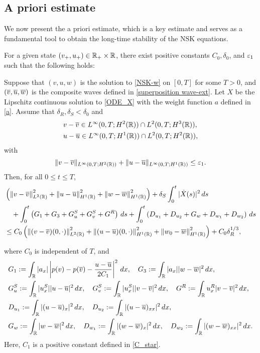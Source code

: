 \documentclass[11pt,reqno]{amsart}
\begin{document}
\subsection{A priori estimate}

We now present the a priori estimate, which is a key estimate and serves as a fundamental tool to obtain the long-time stability of the NSK equations.

	
\begin{proposition}\label{apriori-estimate}
	For a given state $(v_+,u_+)\in\mathbb R_+\times\mathbb R$, there exist positive constants $C_0,\delta_0$, and $\varepsilon_1$ such that the following holds:
		
	Suppose that $(v,u,w)$ is the solution to \eqref{NSK-w} on $[0,T]$ for some $T>0$, and $(\overline{v},\overline{u},\overline{w})$ is the composite waves defined in \eqref{superposition wave-ext}. Let $X$ be the Lipschitz continuous solution to \eqref{ODE_X} with the weight function $a$ defined in \eqref{a}. Assume that $\delta_R,\delta_S<\delta_0$ and
	\begin{align*}
	&v-\overline{v}\in L^\infty(0,T;H^2(\mathbb R))\cap L^2(0,T;H^3(\mathbb{R})),\\
	&u-\overline{u}\in L^\infty(0,T;H^1(\mathbb R))\cap L^2(0,T;H^2(\mathbb R)) ,
	\end{align*}
	with
	\begin{equation}\label{smallness}
	\|v-\overline{v}\|_{L^\infty(0,T;H^2(\mathbb R))}+\|u-\overline{u}\|_{L^\infty(0,T;H^1(\mathbb R))}\le \varepsilon_1.
	\end{equation}
	Then, for all $0\le t\le T$,
	\begin{equation}
	\begin{aligned}\label{a-priori-1}
	&\left(\left\lVert v-\overline{v}\right\rVert_{L^2(\mathbb{R})}^2 +\left\lVert u-\overline{u}\right\rVert_{H^1(\mathbb{R})}^2+\left\lVert w-\overline{w}\right\rVert_{H^1(\mathbb{R})}^2\right)+\delta_S \int_0^t | \dot{X}(s)|^2 \, d s \\ 
	&\quad +\int_0^t \left( G_1+G_3+G^S_u+G^S_v+G^R \right) \, ds +  \int_0^t \left( D_{u_1} + D_{u_2} + G_{w} + D_{w_1} + D_{w_2} \right)\, ds   \\ 
	& \le C_0 \left(\left\lVert(v-\overline{v})(0,\cdot)\right\rVert_{L^2(\mathbb{R})}^2 +\left\lVert(u-\overline{u})(0,\cdot)\right\rVert_{H^1(\mathbb{R})}^2+\left\lVert w_0-\overline{w}\right\rVert_{H^1(\mathbb{R})}^2\right)+C_0\delta_R^{1/3},
	\end{aligned}
	\end{equation}
	
	where $C_0$ is independent of $T$, and
	\begin{equation}\label{good terms}
	\begin{aligned}
	&G_1:=\int_{\mathbb{R}} |a_x|\left|p(v)-p(\overline{v})-\frac{u-\overline{u}}{2C_1}\right|^2\,dx,\quad G_3:=\int_{\mathbb{R}} |a_x||w-\overline{w}|^2\,dx,\\
	&G^S_u:=\int_{\mathbb{R}} |u_x^S||u-\overline{u}|^2\,dx,\quad G^S_v:=\int_{\mathbb{R}} |u^S_x||v-\overline{v}|^2\,dx,\quad G^R:=\int_{\mathbb{R}} u^R_x |v-\overline{v}|^2\,dx,\\
	&D_{u_1}:=\int_{\mathbb{R}} |(u-\overline{u})_x|^2\,dx,\quad D_{u_2}:=\int_{\mathbb{R}} |(u-\overline{u})_{xx}|^2\,dx,\\
	&G_w:=\int_{\mathbb{R}} |w-\overline{w}|^2\,dx,\quad D_{w_1}:=\int_{\mathbb{R}}|(w-\overline{w})_x|^2\,dx,\quad D_{w_2}:=\int_{\mathbb{R}}|(w-\overline{w})_{xx}|^2\,dx.
	\end{aligned}
	\end{equation}
	Here, $C_1$ is a positive constant defined in \eqref{C_star}.
\end{proposition}
	
\end{document}
